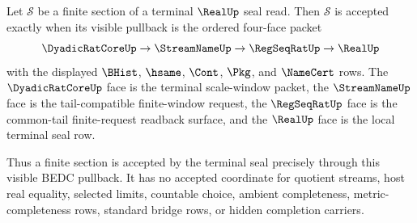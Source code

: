 \begin{theorem}
\label{thm:real-terminal-finite-section-pullback-exactness}
Let $\mathcal S$ be a finite section of a terminal $\RealUp$ seal read. Then
$\mathcal S$ is accepted exactly when its visible pullback is the ordered
four-face packet
$$
\DyadicRatCoreUp \to \StreamNameUp \to \RegSeqRatUp \to \RealUp
$$
with the displayed $\BHist$, $\hsame$, $\Cont$, $\Pkg$, and $\NameCert$ rows.
The $\DyadicRatCoreUp$ face is the terminal scale-window packet, the
$\StreamNameUp$ face is the tail-compatible finite-window request, the
$\RegSeqRatUp$ face is the common-tail finite-request readback surface, and
the $\RealUp$ face is the local terminal seal row.

Thus a finite section is accepted by the terminal seal precisely through this
visible BEDC pullback. It has no accepted coordinate for quotient streams,
host real equality, selected limits, countable choice, ambient completeness,
metric-completeness rows, standard bridge rows, or hidden completion carriers.
\end{theorem}
